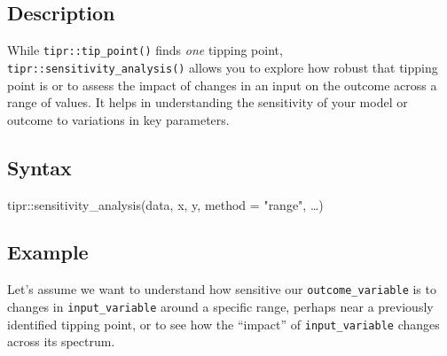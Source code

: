 \documentclass[
  10pt,
  letterpaper,
  DIV=11,
  numbers=noendperiod]{scrartcl}
\newenvironment{Shaded}{\begin{snugshade}}{\end{snugshade}}
\newcommand{\AttributeTok}[1]{\textcolor[rgb]{0.40,0.45,0.13}{#1}}
\newcommand{\FunctionTok}[1]{\textcolor[rgb]{0.28,0.35,0.67}{#1}}
\newcommand{\NormalTok}[1]{\textcolor[rgb]{0.00,0.23,0.31}{#1}}
\newcommand{\SpecialCharTok}[1]{\textcolor[rgb]{0.37,0.37,0.37}{#1}}
\newcommand{\StringTok}[1]{\textcolor[rgb]{0.13,0.47,0.30}{#1}}
\begin{document}
\subsection{Description}\label{description-2}

While \texttt{tipr::tip\_point()} finds \emph{one} tipping point,
\texttt{tipr::sensitivity\_analysis()} allows you to explore how robust
that tipping point is or to assess the impact of changes in an input on
the outcome across a range of values. It helps in understanding the
sensitivity of your model or outcome to variations in key parameters.

\subsection{Syntax}\label{syntax-2}

\begin{Shaded}
\begin{Highlighting}[]
\NormalTok{tipr}\SpecialCharTok{::}\FunctionTok{sensitivity\_analysis}\NormalTok{(data, x, y, }\AttributeTok{method =} \StringTok{"range"}\NormalTok{, …)}
\end{Highlighting}
\end{Shaded}

\subsection{Example}\label{example-2}

Let's assume we want to understand how sensitive our
\texttt{outcome\_variable} is to changes in \texttt{input\_variable}
around a specific range, perhaps near a previously identified tipping
point, or to see how the ``impact'' of \texttt{input\_variable} changes
across its spectrum.
\end{document}
